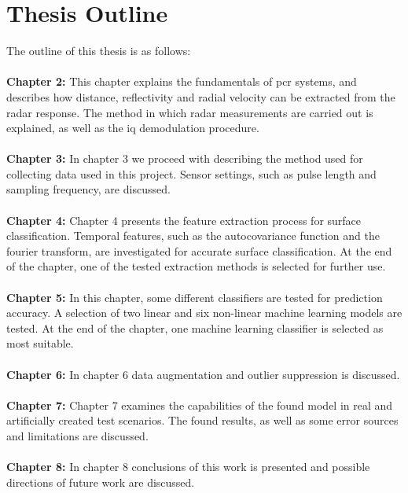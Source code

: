 
\section{Thesis Outline}

The outline of this thesis is as follows:
\\ \\
\noindent\textbf{Chapter 2:} This chapter explains the fundamentals of \gls{pcr} systems, and describes how distance, reflectivity and radial velocity can be extracted from the radar response. The method in which radar measurements are carried out is explained, as well as the \gls{iq} demodulation procedure.
\\ \\
\noindent\textbf{Chapter 3:} In chapter 3 we proceed with describing the method used for collecting data used in this project. Sensor settings, such as pulse length and sampling frequency, are discussed. 
\\ \\
\noindent\textbf{Chapter 4:} Chapter 4 presents the feature extraction process for surface classification. Temporal features, such as the autocovariance function and the fourier transform, are investigated for accurate surface classification. At the end of the chapter, one of the tested extraction methods is selected for further use. 
\\ \\
\noindent\textbf{Chapter 5:}  In this chapter, some different classifiers are tested for prediction accuracy. A selection of two linear and six non-linear machine learning models are tested. At the end of the chapter, one machine learning classifier is selected as most suitable. 
\\ \\
\noindent\textbf{Chapter 6:} In chapter 6 data augmentation and outlier suppression is discussed.  
\\ \\
\noindent\textbf{Chapter 7:} Chapter 7 examines the capabilities of the found model in real and artificially created test scenarios. The found results, as well as some error sources and limitations are discussed.
\\ \\
\noindent\textbf{Chapter 8:} In chapter 8 conclusions of this work is presented and possible directions of future work are discussed. 





